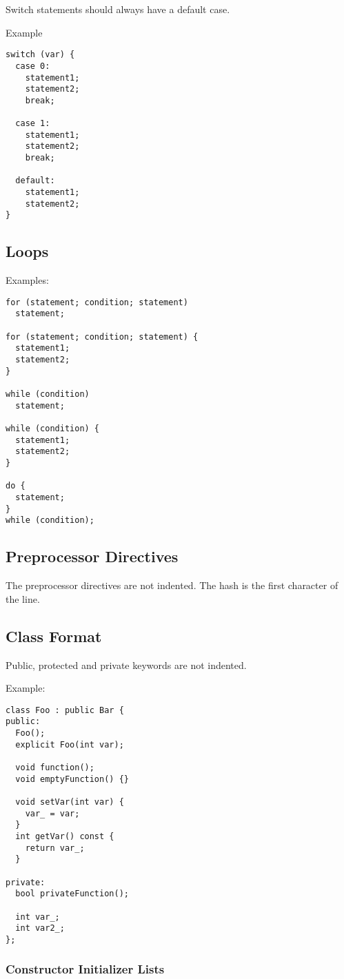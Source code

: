 \documentclass[a4paper]{article}
\begin{document}
Switch statements should always have a default case.

Example
\begin{lstlisting}
switch (var) {
  case 0:
    statement1;
    statement2;
    break;

  case 1:
    statement1;
    statement2;
    break;

  default:
    statement1;
    statement2;  
}
\end{lstlisting}

\subsection{Loops}

Examples:
\begin{lstlisting}
for (statement; condition; statement)
  statement;

for (statement; condition; statement) {
  statement1;
  statement2;
}

while (condition)
  statement;

while (condition) {
  statement1;
  statement2;
}

do {
  statement;
}
while (condition);
\end{lstlisting}

\subsection{Preprocessor Directives}

The preprocessor directives are not indented. The hash is the first character of the line.

\subsection{Class Format}

Public, protected and private keywords are not indented.

Example:
\begin{lstlisting}
class Foo : public Bar {
public:
  Foo();
  explicit Foo(int var);

  void function();
  void emptyFunction() {}

  void setVar(int var) {
    var_ = var;
  }
  int getVar() const {
    return var_;
  }

private:
  bool privateFunction();

  int var_;
  int var2_;
};
\end{lstlisting}

\subsubsection{Constructor Initializer Lists}
\end{document}
